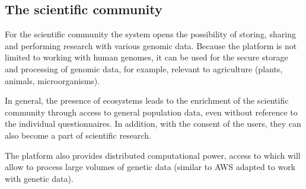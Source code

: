 \subsection{The scientific community}
For the scientific community the system opens the possibility of storing, sharing and performing research with various genomic data. Because the platform is not limited to working with human genomes, it can be used for the secure storage and processing of genomic data, for example, relevant to agriculture (plants, animals, microorganisms).

In general, the presence of ecosystems leads to the enrichment of the scientific community through access to general population data, even without reference to the individual questionnaires. In addition, with the consent of the users, they can also become a part of scientific research.

The platform also provides distributed computational power, access to which will allow to process large volumes of genetic data (similar to AWS adapted to work with genetic data).
